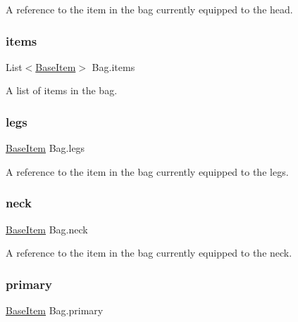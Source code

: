 A reference to the item in the bag currently equipped to the head. 

\mbox{\label{class_bag_a06d313b5ecfa35740d11e1613d1a7695}} 
\subsubsection{\texorpdfstring{items}{items}}
{\footnotesize\ttfamily List$<$\mbox{\hyperlink{class_base_item}{Base\+Item}}$>$ Bag.\+items\hspace{0.3cm}{\ttfamily [get]}}



A list of items in the bag. 

\mbox{\label{class_bag_a06fc81d3974eb764db9be3fda8e63284}} 
\subsubsection{\texorpdfstring{legs}{legs}}
{\footnotesize\ttfamily \mbox{\hyperlink{class_base_item}{Base\+Item}} Bag.\+legs\hspace{0.3cm}{\ttfamily [get]}}



A reference to the item in the bag currently equipped to the legs. 

\mbox{\label{class_bag_a6796ecd4f3c30c4514d45cce11b1907c}} 
\subsubsection{\texorpdfstring{neck}{neck}}
{\footnotesize\ttfamily \mbox{\hyperlink{class_base_item}{Base\+Item}} Bag.\+neck\hspace{0.3cm}{\ttfamily [get]}}



A reference to the item in the bag currently equipped to the neck. 

\mbox{\label{class_bag_af0d1113dd35f217846e53dd477071db1}} 
\subsubsection{\texorpdfstring{primary}{primary}}
{\footnotesize\ttfamily \mbox{\hyperlink{class_base_item}{Base\+Item}} Bag.\+primary\hspace{0.3cm}{\ttfamily [get]}}



